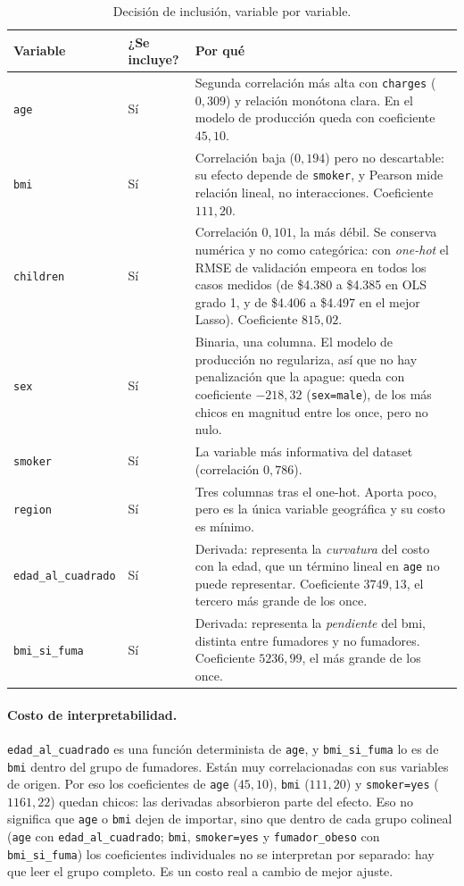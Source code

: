 \documentclass[11pt,a4paper]{article}
\begin{document}
\begin{table}[H]
\centering
\caption{Decisión de inclusión, variable por variable.}
\begin{tabular}{@{}l l p{9.2cm}@{}}
\toprule
\textbf{Variable} & \textbf{¿Se incluye?} & \textbf{Por qué} \\
\midrule
\texttt{age}      & Sí & Segunda correlación más alta con \texttt{charges} ($0{,}309$) y relación monótona clara. En el modelo de producción queda con coeficiente $45{,}10$. \\
\texttt{bmi}      & Sí & Correlación baja ($0{,}194$) pero no descartable: su efecto depende de \texttt{smoker}, y Pearson mide relación lineal, no interacciones. Coeficiente $111{,}20$. \\
\texttt{children} & Sí & Correlación $0{,}101$, la más débil. Se conserva numérica y no como categórica: con \emph{one-hot} el RMSE de validación empeora en todos los casos medidos (de \$4.380 a \$4.385 en OLS grado 1, y de \$4.406 a \$4.497 en el mejor Lasso). Coeficiente $815{,}02$. \\
\texttt{sex}      & Sí & Binaria, una columna. El modelo de producción no regulariza, así que no hay penalización que la apague: queda con coeficiente $-218{,}32$ (\texttt{sex=male}), de los más chicos en magnitud entre los once, pero no nulo. \\
\texttt{smoker}   & Sí & La variable más informativa del dataset (correlación $0{,}786$). \\
\texttt{region}   & Sí & Tres columnas tras el one-hot. Aporta poco, pero es la única variable geográfica y su costo es mínimo. \\
\texttt{edad\_al\_cuadrado} & Sí & Derivada: representa la \emph{curvatura} del costo con la edad, que un término lineal en \texttt{age} no puede representar. Coeficiente $3749{,}13$, el tercero más grande de los once. \\
\texttt{bmi\_si\_fuma} & Sí & Derivada: representa la \emph{pendiente} del bmi, distinta entre fumadores y no fumadores. Coeficiente $5236{,}99$, el más grande de los once. \\
\bottomrule
\end{tabular}
\end{table}

\paragraph{Costo de interpretabilidad.} \texttt{edad\_al\_cuadrado} es una función determinista
de \texttt{age}, y \texttt{bmi\_si\_fuma} lo es de \texttt{bmi} dentro del grupo de fumadores.
Están muy correlacionadas con sus variables de origen. Por eso los coeficientes de
\texttt{age} ($45{,}10$), \texttt{bmi} ($111{,}20$) y \texttt{smoker=yes} ($1161{,}22$) quedan
chicos: las derivadas absorbieron parte del efecto. Eso no significa que \texttt{age} o
\texttt{bmi} dejen de importar, sino que dentro de cada grupo colineal (\texttt{age} con
\texttt{edad\_al\_cuadrado}; \texttt{bmi}, \texttt{smoker=yes} y \texttt{fumador\_obeso} con
\texttt{bmi\_si\_fuma}) los coeficientes individuales no se interpretan por separado: hay que
leer el grupo completo. Es un costo real a cambio de mejor ajuste.
\end{document}
